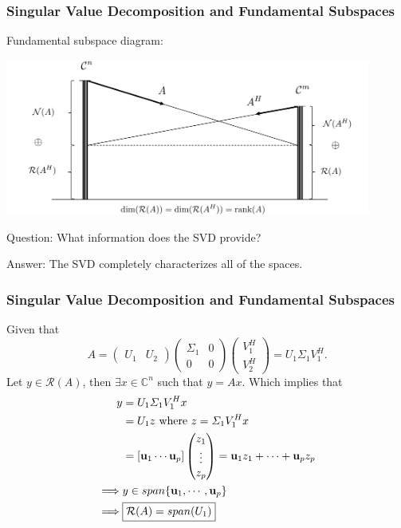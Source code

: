 \documentclass{beamer}
\begin{document}
\begin{frame}\frametitle{Singular Value Decomposition and Fundamental Subspaces}
	Fundamental subspace diagram:
	\begin{center}
		\includegraphics[width=0.9\textwidth]
			{figures/chap7_fundamental_subspace_2}
	\end{center}
	
	{\color{blue}Question:} 
		What information does the SVD provide?
		
	\vfill
	
	{\color{blue}Answer:} 
		The SVD completely characterizes all of the spaces.	
\end{frame}

\begin{frame}\frametitle{Singular Value Decomposition and Fundamental Subspaces}
	Given that 
	\[ 
		A = 
			\begin{pmatrix}
    			U_1 & U_2
  			\end{pmatrix}
  			\begin{pmatrix}
    			\Sigma_1 & 0\\
    			0 & 0
  			\end{pmatrix}
  			\begin{pmatrix}
    			V_1^H\\
    			V_2^H
  			\end{pmatrix}
  		= U_1\Sigma_1 V_1^H.
  	\]
	Let $y \in \mathcal{R}(A)$, then $\exists x \in \mathbb{C}^n$ such that $y = Ax$.  Which implies that 
	\begin{align*}
		y 
			&= U_1\Sigma_1V_1^Hx\\
			&= U_1z \text{ where } z = \Sigma_1V_1^Hx\\
			&= [\mathbf{u}_1 \cdots \mathbf{u}_p]
				\begin{pmatrix}
	    			z_1\\
	    			\vdots\\
	    			z_p
	  			\end{pmatrix} 
	  		= \mathbf{u}_1 z_1 + \cdots + \mathbf{u}_p z_p  \\
		\implies & y \in span\{\mathbf{u}_1, \cdots, \mathbf{u}_p\} \\
		\implies & \fbox{$\mathcal{R}(A) = span(U_1)$}
	\end{align*}
\end{frame}
\end{document}
